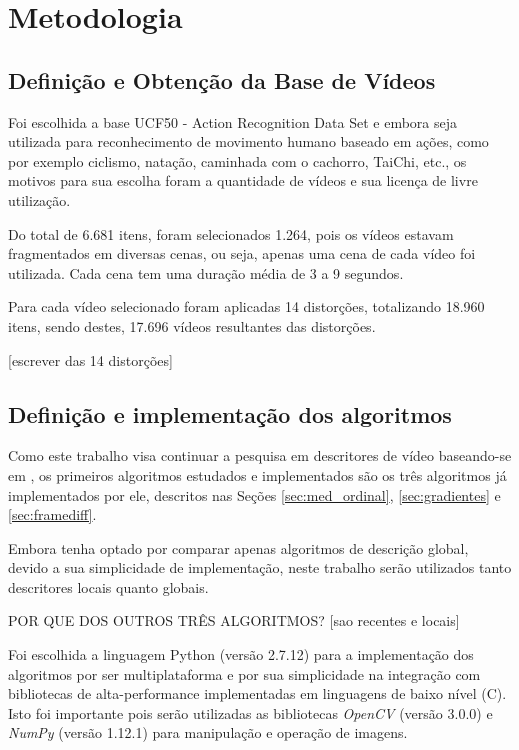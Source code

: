 
\chapter{Metodologia}
\label{chap:metodologia}

\section{Definição e Obtenção da Base de Vídeos}

Foi escolhida a base UCF50 - Action Recognition Data Set \citeauthor{reddy2013recognizing} e embora seja utilizada para reconhecimento de movimento humano baseado em ações, como por exemplo ciclismo, natação, caminhada com o cachorro, TaiChi, etc., os motivos para sua escolha foram a quantidade de vídeos e sua licença de livre utilização. 

Do total de 6.681 itens, foram selecionados 1.264, pois os vídeos estavam fragmentados em diversas cenas, ou seja, apenas uma cena de cada vídeo foi utilizada. Cada cena tem uma duração média de 3 a 9 segundos.

Para cada vídeo selecionado foram aplicadas 14 distorções, totalizando 18.960 itens, sendo destes, 17.696 vídeos resultantes das distorções.

[escrever das 14 distorções]

\section{Definição e implementação dos algoritmos}

Como este trabalho visa continuar a pesquisa em descritores de vídeo baseando-se em \citeauthor{sylvio2015}, os primeiros algoritmos estudados e implementados são os três algoritmos já implementados por ele, descritos nas Seções \ref{sec:med_ordinal}, \ref{sec:gradientes} e \ref{sec:framediff}.

Embora \citeauthor{sylvio2015} tenha optado por comparar apenas algoritmos de descrição global, devido a sua simplicidade de implementação, neste trabalho serão utilizados tanto descritores locais quanto globais.

POR QUE DOS OUTROS TRÊS ALGORITMOS?
[sao recentes e locais]


Foi escolhida a linguagem Python (versão 2.7.12) para a implementação dos algoritmos por ser multiplataforma e  por sua simplicidade na integração com bibliotecas de alta-performance implementadas em linguagens de baixo nível (C). Isto foi importante pois serão utilizadas as bibliotecas \textit{OpenCV} (versão 3.0.0) e \textit{NumPy} (versão 1.12.1) para manipulação e operação de imagens.

